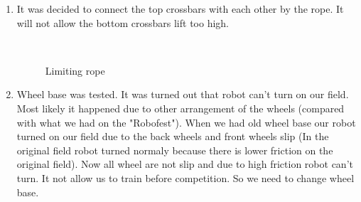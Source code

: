 \begin{enumerate}
\begin{enumerate}
		\item It was decided to connect the top crossbars with each other by the rope. It will not allow the bottom crossbars lift too high.
		\begin{figure}[H]
			\begin{minipage}[h]{0.2\linewidth}
				\center  
			\end{minipage}
			\begin{minipage}[h]{0.6\linewidth}
				\caption{Limiting rope}
			\end{minipage}
		\end{figure}
		
		\item Wheel base was tested. It was turned out that robot can't turn on our field. Most likely it happened due to other arrangement of the wheels (compared with what we had on the "Robofest"). When we had old wheel base our robot turned on our field due to the back wheels and front wheels slip (In the original field robot turned normaly because there is lower friction on the original field). Now all wheel are not slip and due to high friction robot can't turn. It not allow us to train before competition. So we need to change wheel base.
		

\end{enumerate}
\end{enumerate}
